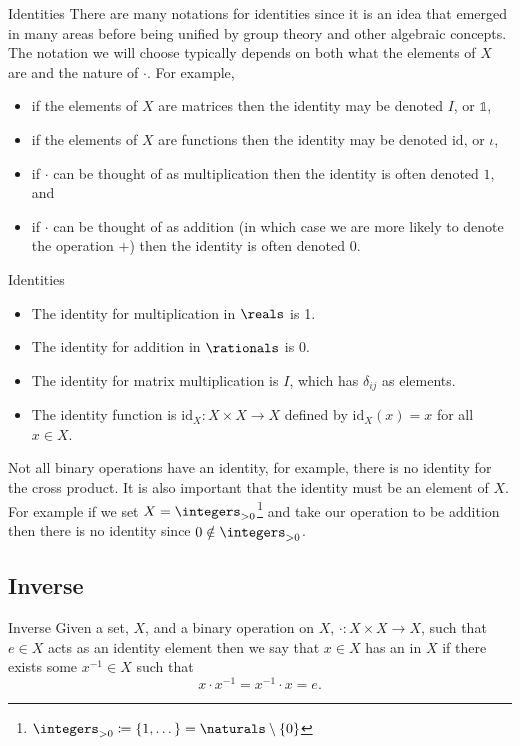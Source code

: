 \begin{ntn}{Identities}{}
    There are many notations for identities since it is an idea that emerged in many areas before being unified by group theory and other algebraic concepts.
    The notation we will choose typically depends on both what the elements of \(X\) are and the nature of \(\cdot\).
    For example,
    \begin{itemize}
        \item if the elements of \(X\) are matrices then the identity may be denoted \(I\), or \(\mathbb{1}\),
        \item if the elements of \(X\) are functions then the identity may be denoted \(\mathrm{id}\), or \(\iota\),
        \item if \(\cdot\) can be thought of as multiplication then the identity is often denoted \(1\), and
        \item if \(\cdot\) can be thought of as addition (in which case we are more likely to denote the operation \(+\)) then the identity is often denoted \(0\).
    \end{itemize}
\end{ntn}

\begin{exm}{Identities}{}
    \begin{itemize}
        \item The identity for multiplication in \(\reals\) is 1.
        \item The identity for addition in \(\rationals\) is 0.
        \item The identity for matrix multiplication is \(I\), which has \(\delta_{ij}\) as elements.
        \item The identity function is \(\mathrm{id}_X \colon X \times X \to X\) defined by \(\mathrm{id}_X(x) = x\) for all \(x \in X\).
    \end{itemize}
\end{exm}

Not all binary operations have an identity, for example, there is no identity for the cross product.
It is also important that the identity must be an element of \(X\).
For example if we set \(X = \positiveintegers\)\footnote{\(\positiveintegers \coloneqq \{1, \dotsc\} = \naturals \setminus \{0\}\)} and take our operation to be addition then there is no identity since \(0 \notin \positiveintegers\).

\subsection{Inverse}
\begin{dfn}{Inverse}{}
    Given a set, \(X\), and a binary operation on \(X\), \(\cdot \colon X \times X \to X\), such that \(e \in X\) acts as an identity element then we say that \(x \in X\) has an  in \(X\) if there exists some \(x^{-1} \in X\) such that
    \begin{equation}
        x \cdot x^{-1} = x^{-1} \cdot x = e.
    \end{equation}
\end{dfn}

